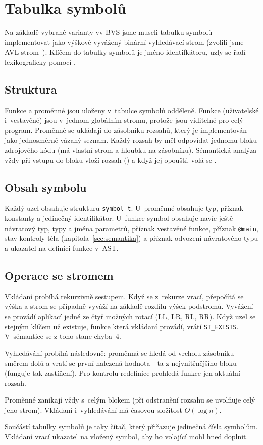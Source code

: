 \section{Tabulka symbolů}\label{sec:symtable}

Na základě vybrané varianty vv-BVS jsme museli tabulku symbolů implementovat jako výškově vyvážený binární
vyhledávací strom (zvolili jsme AVL strom~\cite{ial06vyhledavani}). Klíčem do tabulky symbolů je jméno identifkátoru, uzly se řadí lexikograficky
pomocí .

\subsection{Struktura}
Funkce a proměnné jsou uloženy v~tabulce symbolů odděleně. Funkce (uživatelské i~vestavěné) jsou v~jednom globálním
stromu, protože jsou viditelné pro celý program. Proměnné se ukládají do zásobníku rozsahů, který je implementován
jako jednosměrně vázaný seznam. Každý rozsah by měl odpovídat jednomu bloku zdrojového kódu
(má vlastní strom a hloubku na zásobníku). Sémantická analýza vždy při vstupu do bloku vloží rozsah () a když jej opouští, volá se
.

\subsection{Obsah symbolu}
Každý uzel obsahuje strukturu \texttt{symbol\_t}. U~proměnné obsahuje typ, příznak konstanty a jedinečný identifikátor. U~funkce symbol obsahuje navíc ještě návratový typ,
typy a jména parametrů, příznak vestavěné funkce, příznak \texttt{@main}, stav kontroly těla (kapitola~\ref{sec:semantika}) a příznak odvození
návratového typu a ukazatel na definici funkce v~AST.

\subsection{Operace se stromem}
Vkládaní probíhá rekurzivně sestupem. Když se z~rekurze vrací, přepočítá se výška a strom se případně vyváží na základě rozdílu výšek podstromů.
Vyvážení se provádí aplikací jedné ze čtyř možných rotací (LL, LR, RL, RR). Když uzel se stejným klíčem už existuje, funkce která vkládaní provádí,
vrátí \texttt{ST\_EXISTS}. V~sémantice se z toho stane chyba~4.

Vyhledávání probíhá následovně: proměnná se hledá od vrcholu zásobníku směrem dolů a
vratí se první nalezená hodnota - ta z nejvnitřnějšího bloku (funguje tak zastíňení). Pro kontrolu redefinice prohledá funkce  jen aktuální rozsah.

Proměnné zanikají vždy s~celým blokem (při odstranění rozsahu se uvolňuje celý jeho strom).
Vkládaní i~vyhledávání má časovou složitost $O(\log n)$.

Součástí tabulky symbolů je taky čítač, který přiřazuje jedinečná čísla symbolům.
Vkládaní vrací ukazatel na vložený symbol, aby ho volající mohl hned doplnit.

